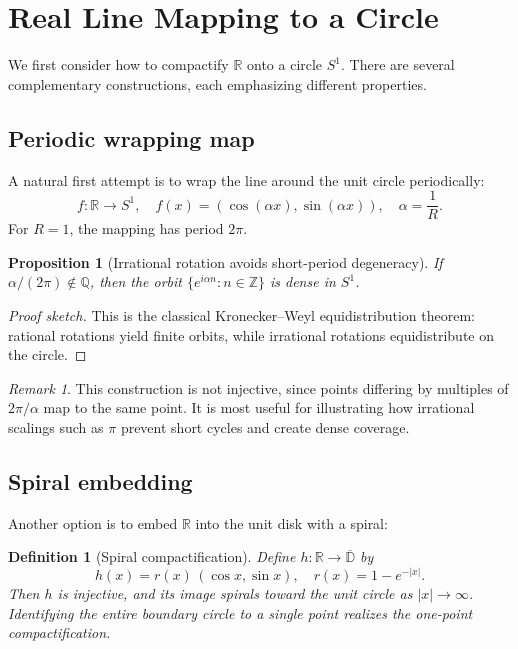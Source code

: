 \documentclass[12pt]{article}
\newtheorem{definition}{Definition}
\newtheorem{proposition}{Proposition}
\theoremstyle{remark}
\newtheorem*{remark}{Remark}
\begin{document}
\section{Real Line Mapping to a Circle}
\label{sec:circle}

We first consider how to compactify $\mathbb{R}$ onto a circle $S^1$. There are 
several complementary constructions, each emphasizing different properties.  

\subsection{Periodic wrapping map}
\label{sec:wrap}
A natural first attempt is to wrap the line around the unit circle periodically:
\begin{equation}\label{eq:wrap}
f: \mathbb{R} \to S^1, 
\quad f(x) = (\cos(\alpha x), \sin(\alpha x)), 
\quad \alpha = \frac{1}{R}.
\end{equation}
For $R=1$, the mapping has period $2\pi$. 

\begin{proposition}[Irrational rotation avoids short-period degeneracy]
If $\alpha/(2\pi)\notin \mathbb{Q}$, then the orbit $\{e^{i\alpha n} : n \in \mathbb{Z}\}$ 
is dense in $S^1$. 
\end{proposition}

\begin{proof}[Proof sketch]
This is the classical Kronecker–Weyl equidistribution theorem: rational rotations 
yield finite orbits, while irrational rotations equidistribute on the circle.  
\end{proof}

\begin{remark}
This construction is not injective, since points differing by multiples of $2\pi/\alpha$ 
map to the same point. It is most useful for illustrating how irrational scalings 
such as $\pi$ prevent short cycles and create dense coverage.
\end{remark}

\subsection{Spiral embedding}
Another option is to embed $\mathbb{R}$ into the unit disk with a spiral:
\begin{definition}[Spiral compactification]
Define $h:\mathbb{R}\to \overline{\mathbb{D}}$ by
\[
h(x) = r(x)\,(\cos x, \sin x), \quad r(x) = 1-e^{-|x|}.
\]
Then $h$ is injective, and its image spirals toward the unit circle as 
$|x|\to\infty$. Identifying the entire boundary circle to a single point realizes 
the one-point compactification.
\end{definition}
\end{document}
